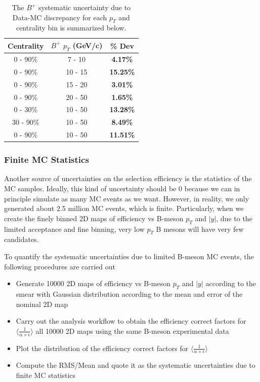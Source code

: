 \begin{table}[h]
\begin{center}
\caption{The $B^+$ systematic uncertainty due to Data-MC discrepancy for each $p_T$ and centrality bin is summarized below.}
\vspace{1em}
\label{BPMCDataSyst}
  \begin{tabular}{| c | c |c |}
    \hline
     Centrality & $B^+$ $p_T$ (GeV/c) & \% Dev \\
    \hline
    \hline
0 - 90\% & 7 - 10 &   \textbf{4.17\% }     \\ 
0 - 90\% & 10 - 15 & \textbf{15.25\% }    \\ 
0 - 90\% & 15 - 20 &  \textbf{3.01\% }     \\ 
0 - 90\% & 20 - 50 &  \textbf{1.65\% }    \\ 
0 - 30\% & 10 - 50 &   \textbf{13.28\% }  \\ 
30 - 90\% & 10 - 50 & \textbf{8.49\% }    \\ 
0 - 90\% & 10 - 50 &  \textbf{11.51\% }   \\ 
    \hline
    \hline
\end{tabular}
\end{center}
\end{table}


\subsubsection{Finite MC Statistics}

Another source of uncertainties on the selection efficiency is the statistics of the MC samples. Ideally, this kind of uncertainty should be 0 because we can in principle simulate as many MC events as we want. However, in reality, we only generated about 2.5 million MC events, which is finite. Particularly, when we create the finely binned 2D maps of efficiency vs B-meson $p_T$ and $|y|$, due to the limited acceptance and fine binning, very low $p_T$ B mesons will have very few candidates.

To quantify the systematic uncertainties due to limited B-meson MC events, the following procedures are carried out

\begin{itemize}
\item Generate 10000 2D maps of efficiency vs B-meson $p_T$ and $|y|$ according to the smear with Gaussian distribution according to the mean and error of the nominal 2D map
\item Carry out the analysis workflow to obtain the efficiency correct factors for $\langle\frac{1}{\alpha \times \epsilon}\rangle$ all 10000 2D maps using the same B-meson experimental data 
\item Plot the distribution of the efficiency correct factors for $\langle\frac{1}{\alpha \times \epsilon}\rangle$
\item Compute the RMS/Mean and quote it as the systematic uncertainties due to finite MC statistics
\end{itemize}

